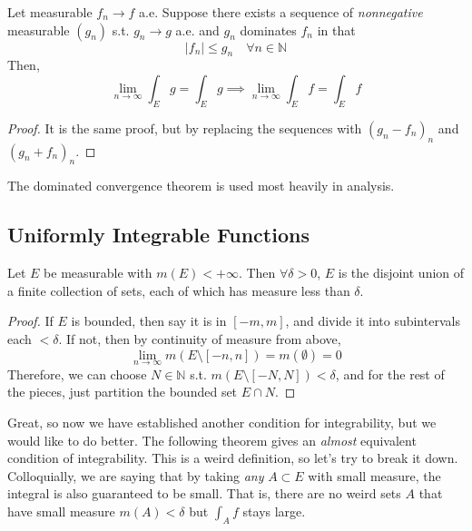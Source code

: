   \begin{theorem}
    Let measurable $f_n \to f$ a.e. Suppose there exists a sequence of \textit{nonnegative} measurable $(g_n)$ s.t. $g_n \to g$ a.e. and $g_n$ dominates $f_n$ in that
    \begin{equation}
      |f_n| \leq g_n \quad \forall n \in \mathbb{N}
    \end{equation}
    Then, 
    \begin{equation}
      \lim_{n \to \infty} \int_E g = \int_E g \implies \lim_{n \to \infty} \int_E f = \int_E f 
    \end{equation}
  \end{theorem}
  \begin{proof}
    It is the same proof, but by replacing the sequences with $(g_n - f_n)_n$ and $(g_n + f_n)_n$. 
  \end{proof}

  The dominated convergence theorem is used most heavily in analysis. 

\subsection{Uniformly Integrable Functions} 

  \begin{lemma}
    Let $E$ be measurable with $m(E) < +\infty$. Then $\forall \delta > 0$, $E$ is the disjoint union of a finite collection of sets, each of which has measure less than $\delta$. 
  \end{lemma}
  \begin{proof}
    If $E$ is bounded, then say it is in $[-m, m]$, and divide it into subintervals each $< \delta$. If not, then by continuity of measure from above, 
    \begin{equation}
      \lim_{n \to \infty} m(E \setminus [-n, n]) = m(\emptyset) = 0
    \end{equation}
    Therefore, we can choose $N \in \mathbb{N}$ s.t. $m(E \setminus [-N, N]) < \delta$, and for the rest of the pieces, just partition the bounded set $E \cap N$.   
  \end{proof}

  Great, so now we have established another condition for integrability, but we would like to do better. The following theorem gives an \textit{almost} equivalent condition of integrability. This is a weird definition, so let's try to break it down. Colloquially, we are saying that by taking \textit{any} $A \subset E$ with small measure, the integral is also guaranteed to be small. That is, there are no weird sets $A$ that have small measure $m(A) < \delta$ but $\int_A f$ stays large. 

